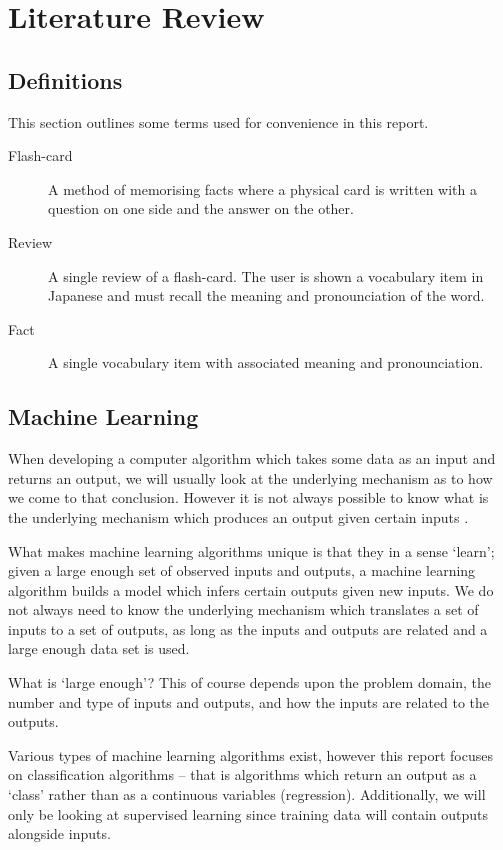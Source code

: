 \chapter{Literature Review}
\label{background}
\section{Definitions}
This section outlines some terms used for convenience in this report.
\begin{description}
\item[Flash-card] A method of memorising facts where a physical card is written with a question on one side and the answer on the other.
\item[Review] A single review of a flash-card. The user is shown a vocabulary item in Japanese and must recall the meaning and pronounciation of the word. 
\item[Fact] A single vocabulary item with associated meaning and pronounciation.
\end{description}
\section{Machine Learning} \label{background_machinelearning}
When developing a computer algorithm which takes some data as an input and returns an output,
we will usually look at the underlying mechanism as to how we come to that conclusion. However it is not
always possible to know what is the underlying mechanism which produces an output
given certain inputs \cite{intro_to_machine_learning_2010}.

What makes machine learning algorithms unique is that they in a sense `learn'; given a large
enough set of observed inputs and outputs, a machine learning algorithm builds a model which infers
certain outputs given new inputs. We do not always need to know the underlying mechanism which
translates a set of inputs to a set of outputs, as long as the inputs and outputs are related and
a large enough data set is used.

What is `large enough'? This of course depends upon the problem domain, the number and type of inputs and outputs,
and how the inputs are related to the outputs. 

Various types of machine learning algorithms exist, however this report focuses on classification
algorithms -- that is algorithms which return an output as a `class' rather than as a continuous variables
(regression). Additionally, we will only be looking at supervised learning since training data will contain
outputs alongside inputs.

